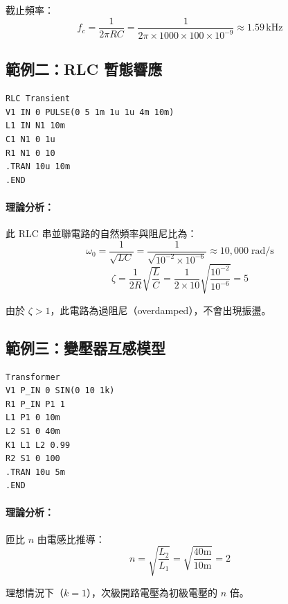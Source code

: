 \documentclass[12pt,a4paper]{article}
\begin{document}
截止頻率：
\begin{equation}
f_c = \frac{1}{2\pi RC} = \frac{1}{2\pi \times 1000 \times 100 \times 10^{-9}} \approx 1.59\,\text{kHz}
\end{equation}

\subsection{範例二：RLC 暫態響應}

\begin{lstlisting}[language=SPICE,caption={RLC 暫態響應}]
RLC Transient
V1 IN 0 PULSE(0 5 1m 1u 1u 4m 10m)
L1 IN N1 10m
C1 N1 0 1u
R1 N1 0 10
.TRAN 10u 10m
.END
\end{lstlisting}

\paragraph{理論分析：}
此 RLC 串並聯電路的自然頻率與阻尼比為：
\begin{equation}
\omega_0 = \frac{1}{\sqrt{LC}} = \frac{1}{\sqrt{10^{-2} \times 10^{-6}}} \approx 10{,}000\;\text{rad/s}
\end{equation}
\begin{equation}
\zeta = \frac{1}{2R}\sqrt{\frac{L}{C}} = \frac{1}{2 \times 10}\sqrt{\frac{10^{-2}}{10^{-6}}} = 5
\end{equation}

由於 $\zeta > 1$，此電路為過阻尼（overdamped），不會出現振盪。

\subsection{範例三：變壓器互感模型}

\begin{lstlisting}[language=SPICE,caption={變壓器模型}]
Transformer
V1 P_IN 0 SIN(0 10 1k)
R1 P_IN P1 1
L1 P1 0 10m
L2 S1 0 40m
K1 L1 L2 0.99
R2 S1 0 100
.TRAN 10u 5m
.END
\end{lstlisting}

\paragraph{理論分析：}
匝比 $n$ 由電感比推導：
\begin{equation}
n = \sqrt{\frac{L_2}{L_1}} = \sqrt{\frac{40\text{m}}{10\text{m}}} = 2
\end{equation}

理想情況下（$k = 1$），次級開路電壓為初級電壓的 $n$ 倍。
\end{document}

